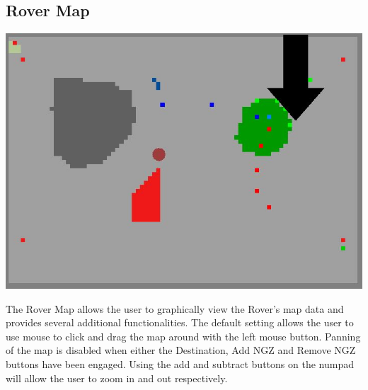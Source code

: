 \documentclass[12pt]{article}
\begin{document}
	\subsection{Rover Map}
		\begin{center}
		\includegraphics[scale=0.7]{RoverMap.jpg}
		\end{center}
The Rover Map allows the user to graphically view the Rover's map data and provides several additional  functionalities. The default setting allows the user to use mouse to click and drag the map around with the left mouse button. Panning of the map is disabled when either the Destination, Add NGZ and Remove NGZ buttons have been engaged. Using the add and subtract buttons on the numpad will allow the user to zoom in and out respectively.
	
\end{document}
